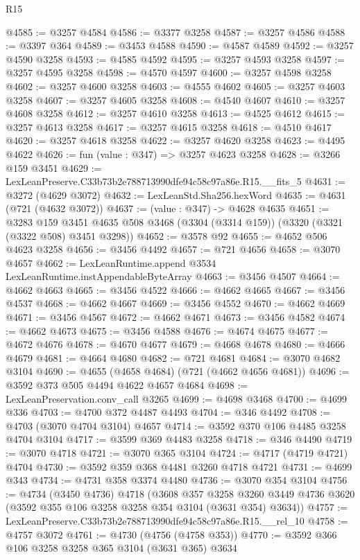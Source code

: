 \begin{lexlean}{R15}
\begin{coremodule}
@4585 := @3257 @4584
@4586 := @3377 @3258
@4587 := @3257 @4586
@4588 := @3397 @364
@4589 := @3453 @4588
@4590 := @4587 @4589
@4592 := @3257 @4590 @3258
@4593 := @4585 @4592
@4595 := @3257 @4593 @3258
@4597 := @3257 @4595 @3258
@4598 := @4570 @4597
@4600 := @3257 @4598 @3258
@4602 := @3257 @4600 @3258
@4603 := @4555 @4602
@4605 := @3257 @4603 @3258
@4607 := @3257 @4605 @3258
@4608 := @4540 @4607
@4610 := @3257 @4608 @3258
@4612 := @3257 @4610 @3258
@4613 := @4525 @4612
@4615 := @3257 @4613 @3258
@4617 := @3257 @4615 @3258
@4618 := @4510 @4617
@4620 := @3257 @4618 @3258
@4622 := @3257 @4620 @3258
@4623 := @4495 @4622
@4626 := fun (value : @347) => @3257 @4623 @3258
@4628 := @3266 @159 @3451
@4629 := LexLeanPreserve.C33b73b2e788713990dfe94c58c97a86e.R15.__fits_5
@4631 := @3272 (@4629 @3072)
@4632 := LexLeanStd.Sha256.hexWord
@4635 := @4631 (@721 (@4632 @3072))
@4637 := (value : @347) -> @4628 @4635
@4651 := @3283
    @159
    @3451
    @4635
    @508
    @3468
    (@3304 (@3314 @159))
    (@3320 (@3321 (@3322 @508) @3451 @3298))
@4652 := @3578 @92
@4655 := @4652 @506 @4623 @3258
@4656 := @3456 @4492
@4657 := @721 @4656
@4658 := @3070 @4657
@4662 := LexLeanRuntime.append @3534 LexLeanRuntime.instAppendableByteArray
@4663 := @3456 @4507
@4664 := @4662 @4663
@4665 := @3456 @4522
@4666 := @4662 @4665
@4667 := @3456 @4537
@4668 := @4662 @4667
@4669 := @3456 @4552
@4670 := @4662 @4669
@4671 := @3456 @4567
@4672 := @4662 @4671
@4673 := @3456 @4582
@4674 := @4662 @4673
@4675 := @3456 @4588
@4676 := @4674 @4675
@4677 := @4672 @4676
@4678 := @4670 @4677
@4679 := @4668 @4678
@4680 := @4666 @4679
@4681 := @4664 @4680
@4682 := @721 @4681
@4684 := @3070 @4682 @3104
@4690 := @4655 (@4658 @4684) (@721 (@4662 @4656 @4681))
@4696 := @3592 @373 @505 @4494 @4622 @4657 @4684
@4698 := LexLeanPreservation.conv_call @3265
@4699 := @4698 @3468
@4700 := @4699 @336
@4703 := @4700 @372 @4487 @4493
@4704 := @346 @4492
@4708 := @4703 (@3070 @4704 @3104) @4657
@4714 := @3592 @370 @106 @4485 @3258 @4704 @3104
@4717 := @3599 @369 @4483 @3258
@4718 := @346 @4490
@4719 := @3070 @4718
@4721 := @3070 @365 @3104
@4724 := @4717 (@4719 @4721) @4704
@4730 := @3592 @359 @368 @4481 @3260 @4718 @4721
@4731 := @4699 @343
@4734 := @4731 @358 @3374 @4480
@4736 := @3070 @354 @3104
@4756 := @4734
    (@3450 @4736)
    @4718
    (@3608
      @357
      @3258
      @3260
      @3449
      @4736
      @3620
      (@3592 @355 @106 @3258 @3258 @354 @3104 (@3631 @354) @3634))
@4757 := LexLeanPreserve.C33b73b2e788713990dfe94c58c97a86e.R15.__rel_10
@4758 := @4757 @3072
@4761 := @4730 (@4756 (@4758 @353))
@4770 := @3592 @366 @106 @3258 @3258 @365 @3104 (@3631 @365) @3634

\end{coremodule}
\end{lexlean}
